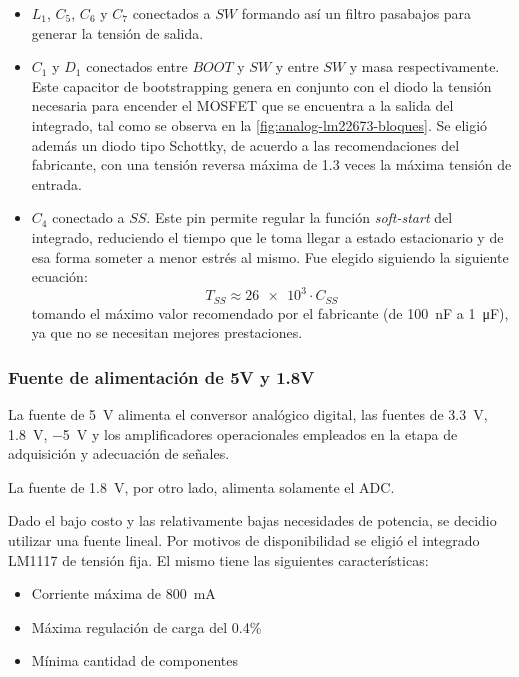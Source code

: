 \documentclass[../et.tex]{subfiles}
\begin{document}
\begin{itemize}
    \item $L_1$, $C_5$, $C_6$ y $C_7$ conectados a $SW$ formando así un filtro pasabajos para generar la tensión de salida.

    \item $C_1$ y $D_1$ conectados entre $BOOT$ y $SW$ y entre $SW$ y masa respectivamente. Este capacitor de bootstrapping genera en conjunto con el diodo la tensión necesaria para encender el MOSFET que se encuentra a la salida del integrado, tal como se observa en la \autoref{fig:analog-lm22673-bloques}. Se eligió además un diodo tipo Schottky, de acuerdo a las recomendaciones del fabricante, con una tensión reversa máxima  de 1.3 veces la máxima tensión de entrada.

    \item $C_4$ conectado a $SS$. Este pin permite regular la función \emph{soft-start} del integrado, reduciendo el tiempo que le toma llegar a estado estacionario y de esa forma someter a menor estrés al mismo. Fue elegido siguiendo la siguiente ecuación:
    \[
      T_{SS} \approx \num{26e3} \cdot C_{SS}
    \]
    tomando el máximo valor recomendado por el fabricante (de \SI{100}{nF} a \SI{1}{\micro F}), ya que no se necesitan mejores prestaciones.

  \end{itemize}

  \subsubsection{Fuente de alimentación de 5V y 1.8V}
  La fuente de \SI{5}{V} alimenta el conversor analógico digital, las fuentes de \SI{3.3}{V}, \SI{1.8}{V}, \SI{-5}{V} y los amplificadores operacionales empleados en la etapa de adquisición y adecuación de señales.

  La fuente de \SI{1.8}{V}, por otro lado, alimenta solamente el ADC.

  Dado el bajo costo y las relativamente bajas necesidades de potencia, se decidio utilizar una fuente lineal. Por motivos de disponibilidad se eligió el integrado LM1117 de tensión fija. El mismo tiene las siguientes características:

  \begin{itemize}
    \item Corriente máxima de \SI{800}{mA}
    \item Máxima regulación de carga del 0.4\%
    \item Mínima cantidad de componentes
  \end{itemize}
\end{document}
